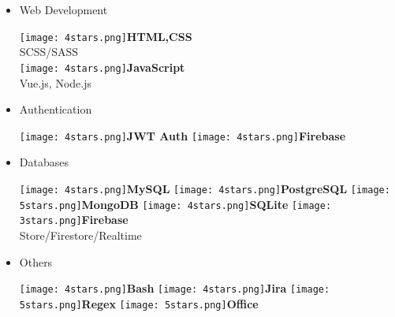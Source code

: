 \documentclass[]{friggeri-cv}
\begin{document}
\begin{flushleft}
\begin{multicols}{3}
\begin{itemize}
\item \large Web Development \
\normalsize
\begin{flushleft}

\texttt{[image: 4stars.png]}\hspace{1.5mm}\textbf{HTML,CSS}\\SCSS/SASS\\
\texttt{[image: 4stars.png]}\hspace{1.5mm}\textbf{JavaScript}\\Vue.js, Node.js\\
\end{flushleft}            

\item \large Authentication \
\normalsize
\begin{flushleft}

\texttt{[image: 4stars.png]}\hspace{1.5mm}\textbf{JWT Auth}
\texttt{[image: 4stars.png]}\hspace{1.5mm}\textbf{Firebase}
\end{flushleft}            

\columnbreak
\item \large Databases \
\normalsize
\begin{flushleft}

\texttt{[image: 4stars.png]}\hspace{1.5mm}\textbf{MySQL}
\texttt{[image: 4stars.png]}\hspace{1.5mm}\textbf{PostgreSQL}
\texttt{[image: 5stars.png]}\hspace{1.5mm}\textbf{MongoDB}
\texttt{[image: 4stars.png]}\hspace{1.5mm}\textbf{SQLite}
\texttt{[image: 3stars.png]}\hspace{1.5mm}\textbf{Firebase}\\Store/Firestore/Realtime\\
\end{flushleft}            

\item \large Others \
\normalsize
\begin{flushleft}

\texttt{[image: 4stars.png]}\hspace{1.5mm}\textbf{Bash}
\texttt{[image: 4stars.png]}\hspace{1.5mm}\textbf{Jira}
\texttt{[image: 5stars.png]}\hspace{1.5mm}\textbf{Regex}
\texttt{[image: 5stars.png]}\hspace{1.5mm}\textbf{Office}
\end{flushleft}            


        \end{itemize}
        \end{multicols}
        \end{flushleft} \normalsize
        \vspace*{-0.65cm}
\end{document}
